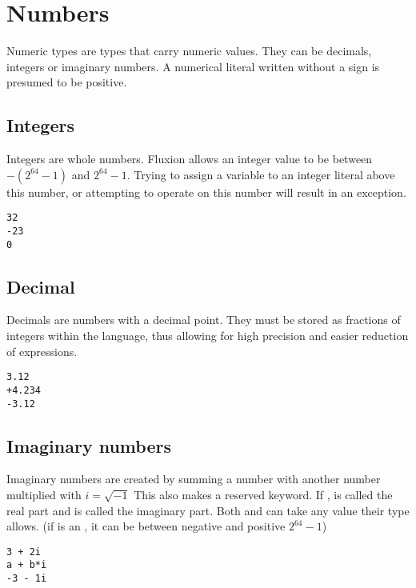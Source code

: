 \documentclass[11pt,a4paper]{book}
\begin{document}
\section{Numbers}

Numeric types are types that carry numeric values. They can be decimals, integers or imaginary numbers. A numerical literal written without a sign is presumed to be positive.

\subsection{Integers}

Integers are whole numbers. Fluxion allows an integer value to be between $-(2^{64} - 1)$ and $2^{64} - 1$. Trying to assign a variable to an integer literal above this number, or attempting to operate on this number will result in an exception.

\begin{lstlisting}[caption={Example integers},captionpos=b]
32
-23
0
\end{lstlisting}

\subsection{Decimal}

Decimals are numbers with a decimal point. They must be stored as fractions of integers within the language, thus allowing for high precision and easier reduction of expressions.

\begin{lstlisting}[caption={Example decimals},captionpos=b]
3.12
+4.234
-3.12
\end{lstlisting}

\subsection{Imaginary numbers}

Imaginary numbers are created by summing a number with another number multiplied with $i = \sqrt{-1}$ This also makes  a reserved keyword. If ,  is called the real part and  is called the imaginary part. Both  and  can take any value their type allows. (if  is an , it can be between negative and positive $2^{64} - 1$)

\begin{lstlisting}[caption={Example imaginals},captionpos=b]
3 + 2i
a + b*i
-3 - 1i
\end{lstlisting}
\end{document}
